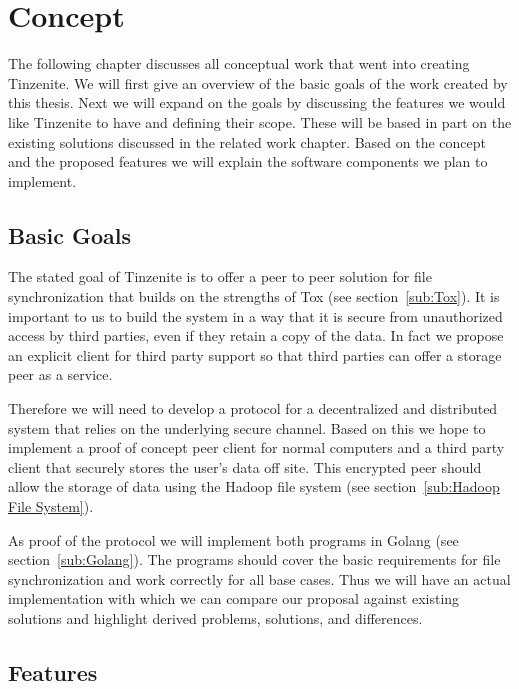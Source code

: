 \chapter{Concept}
\label{chap:concept}

The following chapter discusses all conceptual work that went into creating Tinzenite.
We will first give an overview of the basic goals of the work created by this thesis.
Next we will expand on the goals by discussing the features we would like Tinzenite to have and defining their scope.
These will be based in part on the existing solutions discussed in the related work chapter.
Based on the concept and the proposed features we will explain the software components we plan to implement.

\section{Basic Goals}
\label{sec:Basic Goals}

The stated goal of Tinzenite is to offer a peer to peer solution for file synchronization that builds on the strengths of Tox (see section~\ref{sub:Tox}).
It is important to us to build the system in a way that it is secure from unauthorized access by third parties, even if they retain a copy of the data.
In fact we propose an explicit client for third party support so that third parties can offer a storage peer as a service.

Therefore we will need to develop a protocol for a decentralized and distributed system that relies on the underlying secure channel.
Based on this we hope to implement a proof of concept peer client for normal computers and a third party client that securely stores the user's data off site.
This encrypted peer should allow the storage of data using the Hadoop file system (see section~\ref{sub:Hadoop File System}).

As proof of the protocol we will implement both programs in Golang (see section~\ref{sub:Golang}).
The programs should cover the basic requirements for file synchronization and work correctly for all base cases.
Thus we will have an actual implementation with which we can compare our proposal against existing solutions and highlight derived problems, solutions, and differences.

\section{Features}
\label{sec:Features}

